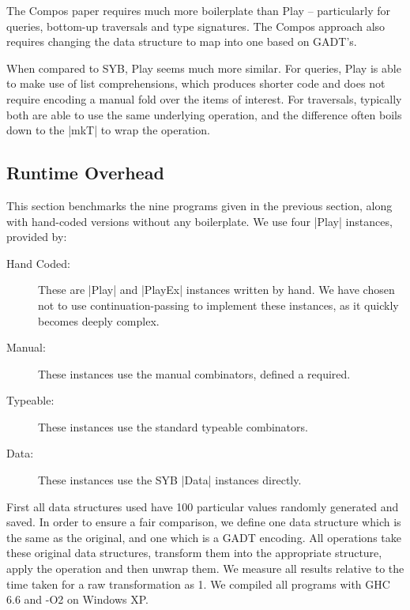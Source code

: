 \documentclass[preprint]{sigplanconf}
\begin{document}
The Compos paper requires much more boilerplate than Play -- particularly for queries, bottom-up traversals and type signatures. The Compos approach also requires changing the data structure to map into one based on GADT's.

When compared to SYB, Play seems much more similar. For queries, Play is able to make use of list comprehensions, which produces shorter code and does not require encoding a manual fold over the items of interest. For traversals, typically both are able to use the same underlying operation, and the difference often boils down to the |mkT| to wrap the operation.


\subsection{Runtime Overhead}

This section benchmarks the nine programs given in the previous section, along with hand-coded versions without any boilerplate. We use four |Play| instances, provided by:

\begin{description}
\item[Hand Coded:] These are |Play| and |PlayEx| instances written by hand. We have chosen not to use continuation-passing to implement these instances, as it quickly becomes deeply complex.
\item[Manual:] These instances use the manual combinators, defined a required.
\item[Typeable:] These instances use the standard typeable combinators.
\item[Data:] These instances use the SYB |Data| instances directly.
\end{description}

First all data structures used have 100 particular values randomly generated and saved. In order to ensure a fair comparison, we define one data structure which is the same as the original, and one which is a GADT encoding. All operations take these original data structures, transform them into the appropriate structure, apply the operation and then unwrap them. We measure all results relative to the time taken for a raw transformation as 1. We compiled all programs with GHC 6.6 and -O2 on Windows XP.
\end{document}
